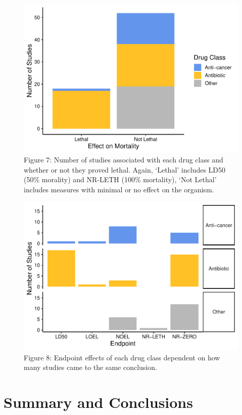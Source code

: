 \documentclass[12pt,]{article}
\begin{document}
\begin{figure}
\centering
\includegraphics{Reents_ENV872L_Project_files/figure-latex/visualization4-1.pdf}
\caption{Figure 7: Number of studies associated with each drug class and
whether or not they proved lethal. Again, `Lethal' includes LD50 (50\%
morality) and NR-LETH (100\% mortality), `Not Lethal' includes measures
with minimal or no effect on the organism.}
\end{figure}

\begin{figure}
\centering
\includegraphics{Reents_ENV872L_Project_files/figure-latex/visualization5-1.pdf}
\caption{Figure 8: Endpoint effects of each drug class dependent on how
many studies came to the same conclusion.}
\end{figure}

\newpage

\section{Summary and Conclusions}\label{summary-and-conclusions}
\end{document}

